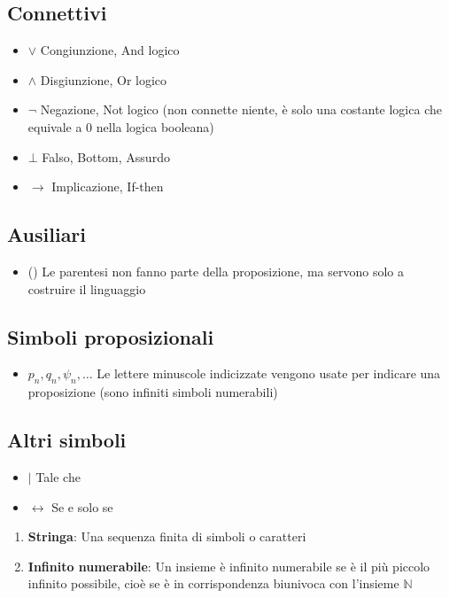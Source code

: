 \documentclass{article}
\theoremstyle{break}
\theoremstyle{break}
\theoremstyle{break}
\theoremstyle{break}
\begin{document}
\subsection{Connettivi}
\begin{itemize}
  \item \( \vee \) Congiunzione, And logico
  \item \( \wedge \) Disgiunzione, Or logico
  \item \( \neg \) Negazione, Not logico (non connette niente, è solo una costante logica
    che equivale a 0 nella logica booleana)
  \item \( \bot \) Falso, Bottom, Assurdo
  \item \( \to  \) Implicazione, If-then
\end{itemize}

\subsection{Ausiliari}
\begin{itemize}
  \item () Le parentesi non fanno parte della proposizione,
    ma servono solo a costruire il linguaggio
\end{itemize}

\subsection{Simboli proposizionali}
\begin{itemize}
  \item \( p_n, q_n, \psi_n, \ldots  \) Le lettere minuscole indicizzate vengono usate per indicare
    una proposizione (sono infiniti simboli numerabili)
\end{itemize}

\subsection{Altri simboli}
\begin{itemize}
  \item \( | \) Tale che
  \item \( \leftrightarrow \) Se e solo se
\end{itemize}

\begin{define}
  \begin{enumerate}
    \item \textbf{Stringa}: Una sequenza finita di simboli o caratteri
    \item \textbf{Infinito numerabile}: Un insieme è infinito numerabile se è il
      più piccolo infinito possibile, cioè se è in corrispondenza
      biunivoca con l'insieme \( \mathbb{N} \)
  \end{enumerate}
\end{define}
\end{document}
